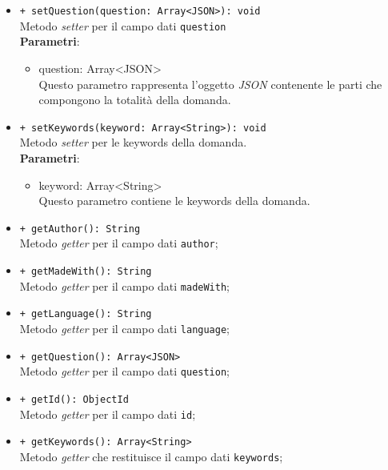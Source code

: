 \begin{itemize}
\begin{itemize}
				\item \texttt{+ setQuestion(question: Array<JSON>): void} \\
				Metodo \textit{setter} per il campo dati \texttt{question}\\
				\textbf{Parametri}:
				\begin{itemize}
					\item {question: Array<JSON>}\\
					Questo parametro rappresenta l'oggetto \textit{JSON} contenente le parti che compongono la totalità della domanda.
				\end{itemize}
				
				\item \texttt{+ setKeywords(keyword: Array<String>): void} \\
				Metodo \textit{setter} per le keywords della domanda.\\
				\textbf{Parametri}:
				\begin{itemize}
					\item {keyword: Array<String>}\\
					Questo parametro contiene le keywords della domanda. 
				\end{itemize}
				
				\item \texttt{+ getAuthor(): String} \\
				Metodo \textit{getter} per il campo dati \texttt{author};
				
				\item \texttt{+ getMadeWith(): String} \\
				Metodo \textit{getter} per il campo dati \texttt{madeWith};
				
				\item \texttt{+ getLanguage(): String} \\
				Metodo \textit{getter} per il campo dati \texttt{language};

				\item \texttt{+ getQuestion(): Array<JSON>} \\
				Metodo \textit{getter} per il campo dati \texttt{question};
				
				\item \texttt{+ getId(): ObjectId} \\
				Metodo \textit{getter} per il campo dati \texttt{id};
				
				\item \texttt{+ getKeywords(): Array<String>} \\
				Metodo \textit{getter} che restituisce il campo dati \texttt{keywords};
				

\end{itemize}
\end{itemize}
